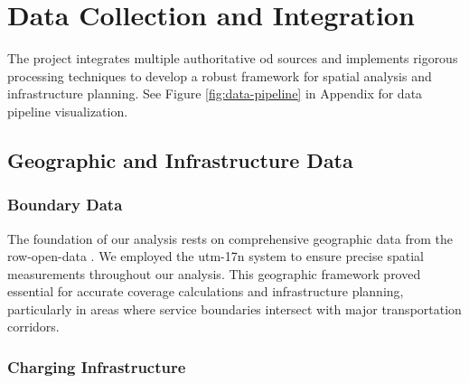 \chapter{Data Collection and Integration}
The project integrates multiple authoritative \gls{od} sources and implements rigorous processing techniques to develop a robust framework for spatial analysis and infrastructure planning. See Figure \ref{fig:data-pipeline} in Appendix for data pipeline visualization.

\section{Geographic and Infrastructure Data}

\subsection{Boundary Data}


The foundation of our analysis rests on comprehensive geographic data from the \gls{row-open-data} \cite{row_opendata_2024}. We employed the \gls{utm-17n} system to ensure precise spatial measurements throughout our analysis. This geographic framework proved essential for accurate coverage calculations and infrastructure planning, particularly in areas where service boundaries intersect with major transportation corridors.

\subsection{Charging Infrastructure}


